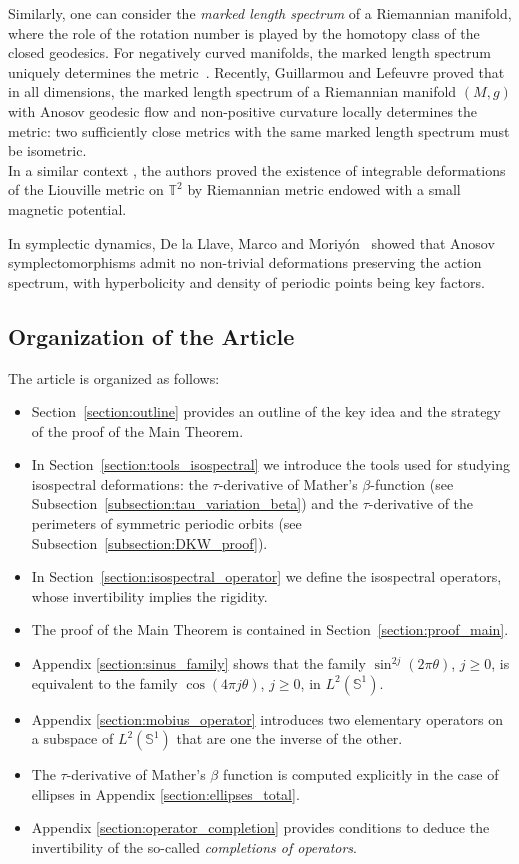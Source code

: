 \documentclass[12pt, openany]{amsart}
\theoremstyle{definition}
\theoremstyle{remark}
\theoremstyle{remark}
\theoremstyle{theorem}
\theoremstyle{theorem}
\theoremstyle{theorem}
\theoremstyle{theorem}
\renewcommand{\SS}{\mathbb{S}}
\newcommand{\TT}{\mathbb{T}}
\begin{document}
Similarly, one can consider the \textit{marked length spectrum} of a Riemannian manifold, where the role of the rotation number is played by the homotopy class of the closed geodesics. For negatively curved manifolds, the marked length spectrum uniquely determines the metric~\cite{Croke,Otal}. Recently, Guillarmou and Lefeuvre \cite{GL} proved that in all dimensions, the marked length spectrum of a Riemannian manifold $(M,g)$ with Anosov geodesic flow and non-positive curvature locally determines the metric: two sufficiently close metrics with the same marked length spectrum must be isometric.\\
In a similar context \cite{AgapovBialyMironov}, the authors proved the existence of integrable deformations of the Liouville metric on $\TT^2$ by Riemannian metric endowed with a small magnetic potential.

In symplectic dynamics, De la Llave, Marco and Moriy\'on~\cite{dMM} showed that Anosov symplectomorphisms admit no non-trivial deformations preserving the action spectrum, with hyperbolicity and density of periodic points being key factors.


  



\subsection{Organization of the Article}
The article is organized as follows:
\begin{itemize}
\item Section~\ref{section:outline} provides an outline of {the key idea and the strategy of }the proof of the Main Theorem.
\item In Section~\ref{section:tools_isospectral} we introduce the tools used for studying isospectral deformations: the $\tau$-derivative of Mather's $\beta$-function (see {Subsection~\ref{subsection:tau_variation_beta}}) and the $\tau$-derivative of the perimeters of symmetric periodic orbits (see {Subsection~\ref{subsection:DKW_proof}}). 
\item In {Section~\ref{section:isospectral_operator}} we define  the  isospectral operators, whose invertibility implies the rigidity. 
\item The proof of the Main Theorem is contained in {Section~\ref{section:proof_main}}.
\item Appendix \ref{section:sinus_family} shows that the family $\sin^{2j}(2\pi\theta)$, $j\geq 0$, is equivalent to the family $\cos(4\pi j\theta)$, $j\geq 0$, in $L^2(\SS^1)$.
\item Appendix \ref{section:mobius_operator} introduces two elementary operators on a subspace of $L^2(\SS^1)$ that are one the inverse of the other.
\item The $\tau$-derivative of Mather's $\beta$ function is computed explicitly in the case of ellipses in Appendix \ref{section:ellipses_total}.
\item Appendix \ref{section:operator_completion} provides conditions to deduce the invertibility of the so-called \textit{completions of operators}.
\end{itemize}
\end{document}
